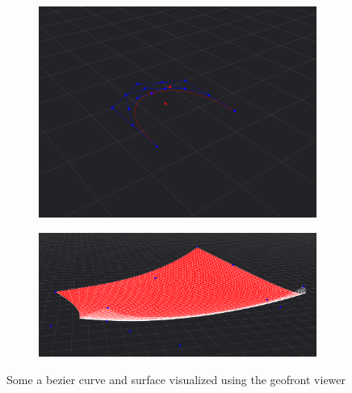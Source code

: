 \begin{figure}
  \centering
  \begin{subfigure}[b]{0.45\linewidth}
    \graphicspath{ {../../assets/images/implementation/} }
    \centering
    \includegraphics[width=\linewidth]{viewer-2.png}
    \caption{}\label{fig:viewer-geometries:1}
  \end{subfigure}%
  \qquad 
  \begin{subfigure}[b]{0.45\linewidth}
    \graphicspath{ {../../assets/images/implementation/} }
    \centering
    \includegraphics[width=\linewidth]{viewer-3.png}
    \caption{}\label{fig:viewer-geometries:2}
  \end{subfigure}%
  \caption[Geofront viewer geometries]{Some a bezier curve and surface visualized using the geofront viewer}
  \label{fig:viewer-geometries}
\end{figure}


